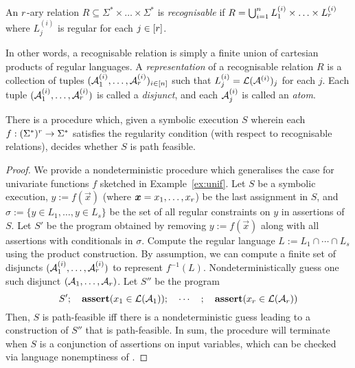 \begin{definition}
    An $r$-ary relation $R\subseteq \Sigma^*\times \ldots\times \Sigma^*$ is \emph{recognisable}  if $R=\bigcup_{i=1}^n L^{(i)}_1\times \ldots\times L^{(i)}_r$ where $L^{(i)}_j$ is regular for each $j\in [r]$.
%
\end{definition}
In other words, a recognisable relation is simply a finite union of 
cartesian products of regular languages. 
A \emph{representation} of a recognisable relation $R$ is a collection of 
tuples $(\mathcal{A}^{(i)}_1, \ldots, \mathcal{A}^{(i)}_r)_{i\in [n]}$  such that 
$L^{(i)}_j = \mathcal{L}(\mathcal{A}^{(i)})_j$ for each $j$.
Each tuple $(\mathcal{A}^{(i)}_1, \ldots, \mathcal{A}^{(i)}_r)$ is called a 
\emph{disjunct}, and  each \FA{} $\mathcal{A}^{(i)}_j$ is called an \emph{atom}.
%
\begin{theorem}
    There is a procedure which, given a symbolic execution $S$ wherein 
    each $f: (\Sigma^*)^r \to \Sigma^*$ satisfies the regularity 
    condition (with respect to recognisable relations), decides whether $S$
    is path feasible.
    \label{th:gen}
\end{theorem}
%
\begin{proof}
    We provide a nondeterministic procedure which generalises the case for
    univariate functions $f$ sketched in Example~\ref{ex:unif}. Let $S$  be a symbolic execution, $y := f(\vec{x})$ (where
    $\vec{x} = x_1,\ldots,x_\arity$) be the last
    assignment in $S$, and $\sigma := \{ y \in L_1,\ldots, y \in L_s\}$
    be the set of all regular constraints on $y$ in assertions of $S$.
    Let $S'$ be the program obtained by removing $y := f(\vec{x})$ along
    with all assertions with conditionals in $\sigma$.
    Compute the regular language $L := L_1 \cap \cdots \cap L_s$ using
    the product construction. By 
    assumption, we can compute a finite set of disjuncts
    $(\mathcal{A}^{(i)}_1, \ldots, \mathcal{A}^{(i)}_r)$  to represent
    $f^{-1}(L)$. Nondeterministically guess one such disjunct
    $(\mathcal{A}_1, \ldots, \mathcal{A}_r)$. Let $S''$ be the program 
    \[
        S'; \quad \textbf{assert}(x_1 \in \mathcal{L}(\mathcal{A}_1)); \quad \cdots\quad ; \quad \textbf{assert}(x_r \in
        \mathcal{L}(\mathcal{A}_r))
    \]
    Then, $S$ is path-feasible iff there is a nondeterministic guess leading
    to a construction of $S''$ that is path-feasible. 
    In sum, the procedure will terminate when $S$ is a conjunction of
    assertions on input variables, which can be
    checked via language nonemptiness of \FA{}.
\end{proof}
